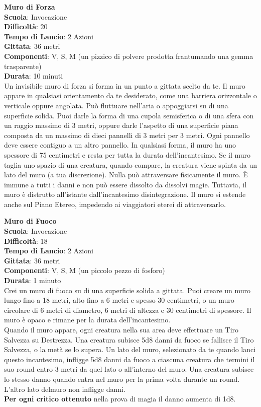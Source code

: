 \begin{multicols}{2}
\medskip\textbf{Muro di Forza}\\
\textbf{Scuola}: Invocazione\\
\textbf{Difficoltà}:  20\\
\textbf{Tempo di Lancio}: 2 Azioni\\
\textbf{Gittata}: 36 metri\\
\textbf{Componenti}: V, S, M (un pizzico di polvere prodotta frantumando una gemma trasparente)\\
\textbf{Durata}: 10 minuti\\
Un invisibile muro di forza si forma in un punto a gittata scelto da te. Il muro appare in qualsiasi orientamento da te desiderato, come una barriera orizzontale o verticale oppure angolata. Può fluttuare nell'aria o appoggiarsi su di una superficie solida. Puoi darle la forma di una cupola semisferica o di una sfera con un raggio massimo di 3 metri, oppure darle l’aspetto di una superficie piana composta da un massimo di dieci pannelli di 3 metri per 3 metri. Ogni pannello deve essere contiguo a un altro pannello. In qualsiasi forma, il muro ha uno spessore di 75 centimetri e resta per tutta la durata dell'incantesimo. Se il muro taglia uno spazio di una creatura, quando compare, la creatura viene spinta da un lato del muro (a tua discrezione). Nulla può attraversare fisicamente il muro. È immune a tutti i danni e non può essere dissolto da dissolvi magie. Tuttavia, il muro è distrutto all'istante dall'incantesimo disintegrazione. Il muro si estende anche sul Piano Etereo, impedendo ai viaggiatori eterei di attraversarlo.

\medskip\textbf{Muro di Fuoco}\\
\textbf{Scuola}: Invocazione\\
\textbf{Difficoltà}:  18\\
\textbf{Tempo di Lancio}: 2 Azioni\\
\textbf{Gittata}: 36 metri\\
\textbf{Componenti}: V, S, M (un piccolo pezzo di fosforo)\\
\textbf{Durata}: 1 minuto\\
Crei un muro di fuoco su di una superficie solida a gittata. Puoi creare un muro lungo fino a 18 metri, alto fino a 6 metri e spesso 30 centimetri, o un muro circolare di 6 metri di diametro, 6 metri di altezza e 30 centimetri di spessore. Il muro è opaco e rimane per la durata dell'incantesimo. \\
Quando il muro appare, ogni creatura nella sua area deve effettuare un Tiro Salvezza su Destrezza. Una creatura subisce 5d8 danni da fuoco se fallisce il Tiro Salvezza, o la metà se lo supera. Un lato del muro, selezionato da te quando lanci questo incantesimo, infligge 5d8 danni da fuoco a ciascuna creatura che termini il suo round entro 3 metri da quel lato o all'interno del muro. Una creatura subisce lo stesso danno quando entra nel muro per la prima volta durante un round. L’altro lato delmuro non infligge  danni.\\
\textbf{Per ogni critico ottenuto} nella prova di magia il danno aumenta di 1d8.


\end{multicols}

